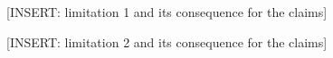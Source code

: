 [INSERT: limitation 1 and its consequence for the claims]

[INSERT: limitation 2 and its consequence for the claims]
